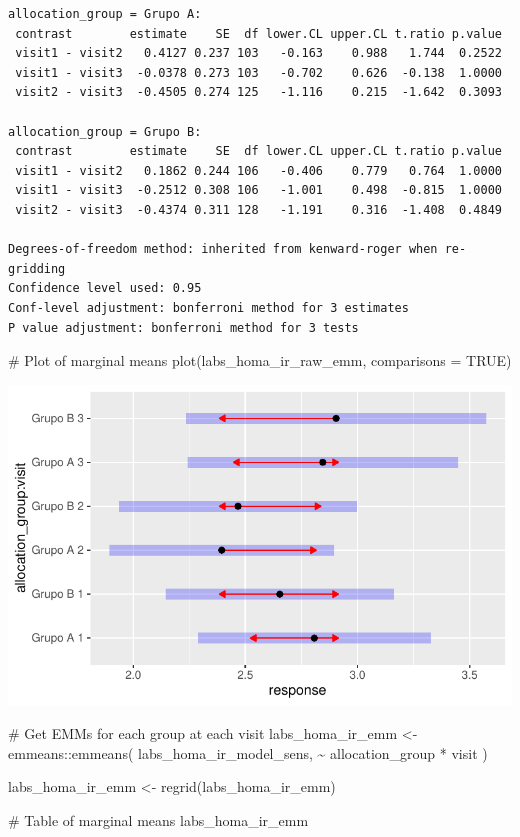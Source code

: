 \documentclass[
  letterpaper,
  DIV=11,
  numbers=noendperiod]{scrartcl}
\newenvironment{Shaded}{\begin{snugshade}}{\end{snugshade}}
\newcommand{\AttributeTok}[1]{\textcolor[rgb]{0.40,0.45,0.13}{#1}}
\newcommand{\CommentTok}[1]{\textcolor[rgb]{0.37,0.37,0.37}{#1}}
\newcommand{\ConstantTok}[1]{\textcolor[rgb]{0.56,0.35,0.01}{#1}}
\newcommand{\FunctionTok}[1]{\textcolor[rgb]{0.28,0.35,0.67}{#1}}
\newcommand{\NormalTok}[1]{\textcolor[rgb]{0.00,0.23,0.31}{#1}}
\newcommand{\OtherTok}[1]{\textcolor[rgb]{0.00,0.23,0.31}{#1}}
\newcommand{\SpecialCharTok}[1]{\textcolor[rgb]{0.37,0.37,0.37}{#1}}
\begin{document}
\begin{verbatim}
allocation_group = Grupo A:
 contrast        estimate    SE  df lower.CL upper.CL t.ratio p.value
 visit1 - visit2   0.4127 0.237 103   -0.163    0.988   1.744  0.2522
 visit1 - visit3  -0.0378 0.273 103   -0.702    0.626  -0.138  1.0000
 visit2 - visit3  -0.4505 0.274 125   -1.116    0.215  -1.642  0.3093

allocation_group = Grupo B:
 contrast        estimate    SE  df lower.CL upper.CL t.ratio p.value
 visit1 - visit2   0.1862 0.244 106   -0.406    0.779   0.764  1.0000
 visit1 - visit3  -0.2512 0.308 106   -1.001    0.498  -0.815  1.0000
 visit2 - visit3  -0.4374 0.311 128   -1.191    0.316  -1.408  0.4849

Degrees-of-freedom method: inherited from kenward-roger when re-gridding 
Confidence level used: 0.95 
Conf-level adjustment: bonferroni method for 3 estimates 
P value adjustment: bonferroni method for 3 tests 
\end{verbatim}

\begin{Shaded}
\begin{Highlighting}[]
\CommentTok{\# Plot of marginal means}
\FunctionTok{plot}\NormalTok{(labs\_homa\_ir\_raw\_emm, }\AttributeTok{comparisons =} \ConstantTok{TRUE}\NormalTok{)}
\end{Highlighting}
\end{Shaded}

\includegraphics{Outcomes_V1V2V3_files/figure-pdf/labs_homa_ir_raw_emm-1.pdf}

\begin{Shaded}
\begin{Highlighting}[]
\CommentTok{\# Get EMMs for each group at each visit}
\NormalTok{labs\_homa\_ir\_emm }\OtherTok{\textless{}{-}}\NormalTok{ emmeans}\SpecialCharTok{::}\FunctionTok{emmeans}\NormalTok{(}
\NormalTok{    labs\_homa\_ir\_model\_sens, }
    \SpecialCharTok{\textasciitilde{}}\NormalTok{ allocation\_group }\SpecialCharTok{*}\NormalTok{ visit}
\NormalTok{)}

\NormalTok{labs\_homa\_ir\_emm }\OtherTok{\textless{}{-}} \FunctionTok{regrid}\NormalTok{(labs\_homa\_ir\_emm)}

\CommentTok{\# Table of marginal means}
\NormalTok{labs\_homa\_ir\_emm}
\end{Highlighting}
\end{Shaded}
\end{document}
